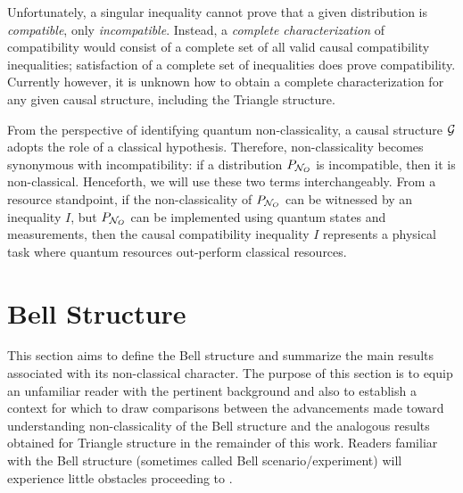 \documentclass[aps, 10pt, english, twoside, pra, nofootinbib, tightenlines, longbibliography, superscriptaddress]{revtex4-1}
\begin{document}
    Unfortunately, a singular inequality cannot prove that a given distribution is \textit{compatible}, only \textit{incompatible}. Instead, a \textit{complete characterization} of compatibility would consist of a complete set of all valid causal compatibility inequalities; satisfaction of a complete set of inequalities does prove compatibility. Currently however, it is unknown how to obtain a complete characterization for any given causal structure, including the Triangle structure.

    From the perspective of identifying quantum non-classicality, a causal structure $\mathcal{G}$ adopts the role of a classical hypothesis. Therefore, non-classicality becomes synonymous with incompatibility: if a distribution $\prob[\nodes_{O}]$ is incompatible, then it is non-classical. Henceforth, we will use these two terms interchangeably. From a resource standpoint, if the non-classicality of $\prob[\nodes_{O}]$ can be witnessed by an inequality $I$, but $\prob[\nodes_{O}]$ can be implemented using quantum states and measurements, then the causal compatibility inequality $I$ represents a physical task where quantum resources out-perform classical resources.

    \section{Bell Structure}
    \label{sec:bell_structure}
    This section aims to define the Bell structure and summarize the main results associated with its non-classical character. The purpose of this section is to equip an unfamiliar reader with the pertinent background and also to establish a context for which to draw comparisons between the advancements made toward understanding non-classicality of the Bell structure and the analogous results obtained for Triangle structure in the remainder of this work. Readers familiar with the Bell structure (sometimes called Bell scenario/experiment) will experience little obstacles proceeding to .
\end{document}
